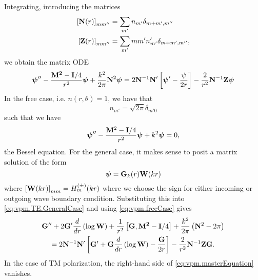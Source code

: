 Integrating, introducing the matrices
  \begin{subequations}
  \begin{align}
   \left[\mathbf{N}(r)\right]_{mm''}	&= \sum_{m'}n_{m'}\delta_{m+m',m''}	\\
   \left[\mathbf{Z}(r)\right]_{mm''}	&= \sum_{m'}mm'n_{m'}'\delta_{m+m',m''},
  \end{align}
  \end{subequations}
we obtain the matrix ODE
  \begin{equation}
  \label{eq:vpm.TE.GeneralCase}
  \boldsymbol{\psi}''-\frac{\mathbf{M^2}-\mathbf{I}/4}{r^2}\boldsymbol{\psi}+\frac{k^2}{2\pi}\mathbf{N}^2\boldsymbol{\psi}
    =
   2\mathbf{N}^{-1}\mathbf{N}'\left[\boldsymbol{\psi}'-\frac{\psi}{2r}\right]-\frac{2}{r^2}\mathbf{N}^{-1}\mathbf{Z}\boldsymbol{\psi}
  \end{equation}
In the free case, i.e. $n(r,\theta)=1$, we have that
  \begin{equation}
   n_{m'} = \sqrt{2\pi}\delta_{m'0}
  \end{equation}
such that we have
  \begin{equation}
    \label{eq:vpm.freeCase}
    \boldsymbol{\psi}''-\frac{\mathbf{M}^2-\mathbf{I}/4}{r^2}\boldsymbol{\psi}+k^2\boldsymbol{\psi}=0,
  \end{equation}
the Bessel equation. For the general case, it makes sense
to posit a matrix solution of the form
  \begin{equation}
   \boldsymbol{\psi}=\mathbf{G}_k(r)\mathbf{W}(kr)
  \end{equation}
where $\left[\mathbf{W}(kr)\right]_{mm}=H_m^{(\pm)}(kr)$ where
we choose the sign for either incoming or outgoing 
wave boundary condition. Substituting this into \eqref{eq:vpm.TE.GeneralCase}
and using \eqref{eq:vpm.freeCase} gives
  \begin{multline}
    \label{eq:vpm.masterEquation}
    \mathbf{G}''+2\mathbf{G}'\frac{d}{dr}\left(\log\mathbf{W}\right)+\frac{1}{r^2}\left[\mathbf{G},\mathbf{M^2}-\mathbf{I}/4\right]+\frac{k^2}{2\pi}\left(\mathbf{N}^2-2\pi\right)
     \\ =
    2\mathbf{N}^{-1}\mathbf{N}'\left[\mathbf{G}'+\mathbf{G}\frac{d}{dr}\left(\log\mathbf{W}\right)-\frac{\mathbf{G}}{2r}\right]-\frac{2}{r^2}\mathbf{N}^{-1}\mathbf{ZG}.
  \end{multline}
In the case of TM polarization, the right-hand side 
of \eqref{eq:vpm.masterEquation} vanishes. 

